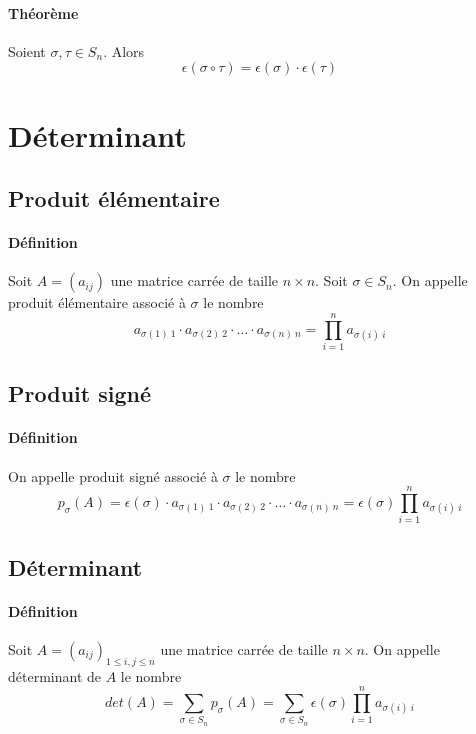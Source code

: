 \paragraph{Théorème} Soient $\sigma, \tau \in S_n$. Alors
$$\epsilon(\sigma \circ \tau) = \epsilon(\sigma) \cdot \epsilon(\tau)$$

%
%
\section{Déterminant}
%
%

%
\subsection{Produit élémentaire}
%
\paragraph{Définition} Soit $A = (a_{ij})$ une matrice carrée de taille $n\times n$. Soit $\sigma \in S_n$. On appelle produit élémentaire associé à $\sigma$ le nombre
$$a_{\sigma(1) ~ 1} \cdot a_{\sigma(2) ~ 2} \cdot \ldots \cdot a_{\sigma(n) ~ n} = \prod_{i=1}^{n} a_{\sigma(i) ~ i}$$
%
\subsection{Produit signé}
%
\paragraph{Définition} On appelle produit signé associé à $\sigma$ le nombre 
$$p_{\sigma}(A) = \epsilon(\sigma) \cdot a_{\sigma(1) ~ 1} \cdot a_{\sigma(2) ~ 2} \cdot \ldots \cdot a_{\sigma(n) ~ n} = \epsilon(\sigma) \prod_{i=1}^{n} a_{\sigma(i) ~ i}$$

%
\subsection{Déterminant}
%
\paragraph{Définition} Soit $A = (a_{ij})_{1 \leq i, j \leq n}$ une matrice carrée de taille $n \times n$. On appelle déterminant de $A$ le nombre
$$det(A) = \sum_{\sigma \in S_n} p_{\sigma}(A) = \sum_{\sigma \in S_n} \epsilon(\sigma) \prod_{i=1}^{n} a_{\sigma(i) ~ i}$$

